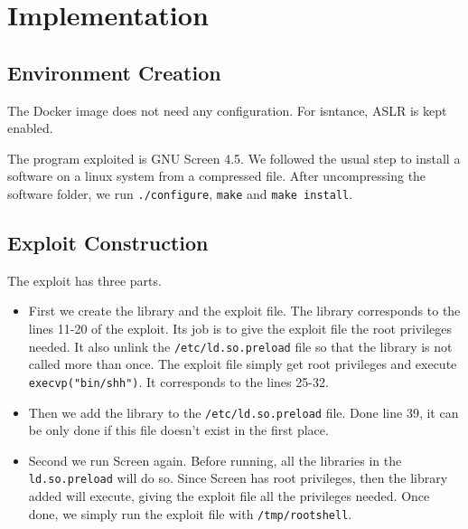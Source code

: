 \section{Implementation}
\subsection{Environment Creation}
The Docker image does not need any configuration. For isntance, ASLR is kept enabled.

The program exploited is GNU Screen 4.5. We followed the usual step to install a software on a linux system from a compressed file. After uncompressing the software folder, we run {\tt ./configure}, {\tt make} and {\tt make install}.

\subsection{Exploit Construction}
The exploit has three parts.

\begin{itemize}
\item First we create the library and the exploit file. The library corresponds to the lines 11-20 of the exploit. Its job is to give the exploit file the root privileges needed. It also unlink the {\tt /etc/ld.so.preload} file so that the library is not called more than once. The exploit file simply get root privileges and execute {\tt execvp("bin/shh")}. It corresponds to the lines 25-32.
\item Then we add the library to the {\tt /etc/ld.so.preload} file. Done line 39, it can be only done if this file doesn't exist in the first place.
\item Second we run Screen again. Before running, all the libraries in the {\tt ld.so.preload} will do so. Since Screen has root privileges, then the library added will execute, giving the exploit file all the privileges needed. Once done, we simply run the exploit file with {\tt /tmp/rootshell}.
\end{itemize}

